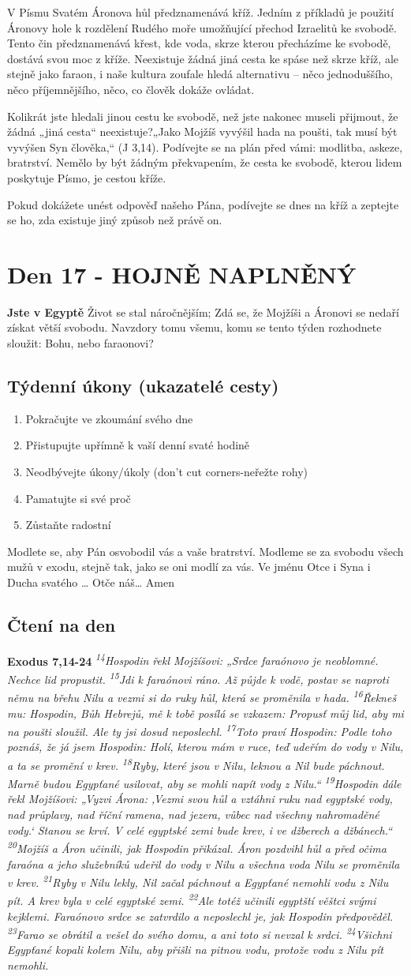 \documentclass[11pt]{article}
\newcommand{\zacatekTretiTyden}{
  \textbf{Jste v Egyptě} \newline
  Život se stal náročnějším; Zdá se, že Mojžíši a Áronovi se nedaří získat větší svobodu. Navzdory tomu všemu,
komu se tento týden rozhodnete sloužit: Bohu, nebo faraonovi?

\subsection*{Týdenní úkony (ukazatelé cesty)}
\begin{enumerate}
  \item Pokračujte ve zkoumání svého dne
  \item Přistupujte upřímně k vaší denní svaté hodině
  \item Neodbývejte úkony/úkoly (don’t cut corners-neřežte rohy)
  \item Pamatujte si své proč
  \item Zůstaňte radostní
\end{enumerate}
Modlete se, aby Pán osvobodil vás a vaše bratrství. \newline
Modleme se za svobodu všech mužů v exodu, stejně tak, jako se oni modlí za vás.\newline
Ve jménu Otce i Syna i Ducha svatého …  Otče náš… Amen
}
\begin{document}
V Písmu Svatém Áronova hůl předznamenává kříž. Jedním z příkladů je použití Áronovy hole k rozdělení
Rudého moře umožňující přechod Izraelitů ke svobodě. Tento čin předznamenává křest, kde voda, skrze
kterou přecházíme ke svobodě, dostává svou moc z kříže. Neexistuje žádná jiná cesta ke spáse než skrze
kříž, ale stejně jako faraon, i naše kultura zoufale hledá alternativu – něco jednoduššího, něco
příjemnějšího, něco, co člověk dokáže ovládat.

Kolikrát jste hledali jinou cestu ke svobodě, než jste nakonec museli přijmout, že žádná „jiná cesta“
neexistuje?„Jako Mojžíš vyvýšil hada na poušti, tak musí být vyvýšen Syn člověka,“ (J 3,14). Podívejte
se na plán před vámi: modlitba, askeze, bratrství. Nemělo by být žádným překvapením, že cesta ke
svobodě, kterou lidem poskytuje Písmo, je cestou kříže.

Pokud dokážete unést odpověď našeho Pána, podívejte se dnes na kříž a zeptejte se ho, zda existuje jiný
způsob než právě on.

\newpage
\section{Den 17 - HOJNĚ NAPLNĚNÝ}
\zacatekTretiTyden
\subsection*{Čtení na den}
\textbf{Exodus 7,14-24}
\newline
\textit{ 
\textsuperscript{14}Hospodin řekl Mojžíšovi: „Srdce faraónovo je neoblomné. Nechce lid propustit.
\textsuperscript{15}Jdi k faraónovi ráno. Až půjde k vodě, postav se naproti němu na břehu Nilu a vezmi si do ruky hůl, která se proměnila v hada.
\textsuperscript{16}Řekneš mu: Hospodin, Bůh Hebrejů, mě k tobě posílá se vzkazem: Propusť můj lid, aby mi na poušti sloužil. Ale ty jsi dosud neposlechl.
\textsuperscript{17}Toto praví Hospodin: Podle toho poznáš, že já jsem Hospodin: Holí, kterou mám v ruce, teď udeřím do vody v Nilu, a ta se promění v krev.
\textsuperscript{18}Ryby, které jsou v Nilu, leknou a Nil bude páchnout. Marně budou Egypťané usilovat, aby se mohli napít vody z Nilu.“
\textsuperscript{19}Hospodin dále řekl Mojžíšovi: „Vyzvi Árona: ‚Vezmi svou hůl a vztáhni ruku nad egyptské vody, nad průplavy, nad říční ramena, nad jezera, vůbec nad všechny nahromaděné vody.‘ Stanou se krví. V celé egyptské zemi bude krev, i ve džberech a džbánech.“
\textsuperscript{20}Mojžíš a Áron učinili, jak Hospodin přikázal. Áron pozdvihl hůl a před očima faraóna a jeho služebníků udeřil do vody v Nilu a všechna voda Nilu se proměnila v krev.
\textsuperscript{21}Ryby v Nilu lekly, Nil začal páchnout a Egypťané nemohli vodu z Nilu pít. A krev byla v celé egyptské zemi.
\textsuperscript{22}Ale totéž učinili egyptští věštci svými kejklemi. Faraónovo srdce se zatvrdilo a neposlechl je, jak Hospodin předpověděl.
\textsuperscript{23}Farao se obrátil a vešel do svého domu, a ani toto si nevzal k srdci.
\textsuperscript{24}Všichni Egypťané kopali kolem Nilu, aby přišli na pitnou vodu, protože vodu z Nilu pít nemohli.
}
\end{document}
